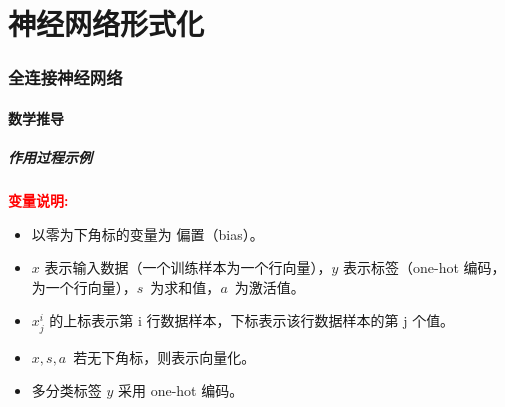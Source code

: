 \part{神经网络形式化}

\section{全连接神经网络}

\subsection{数学推导}

\subsubsection{作用过程示例}


\noindent\textcolor{red}{\textbf{变量说明:}}
\begin{itemize}
  \item 以零为下角标的变量为 偏置（bias）。
  \item $x$ 表示输入数据（一个训练样本为一个行向量），$y$ 表示标签（one-hot 编码，为一个行向量），$s$~为求和值，$a$~为激活值。
  \item $x^i_j$ 的上标表示第 i 行数据样本，下标表示该行数据样本的第 j 个值。
  \item $x,s,a$~若无下角标，则表示向量化。
  \item 多分类标签 $y$ 采用 one-hot 编码。
\end{itemize}

